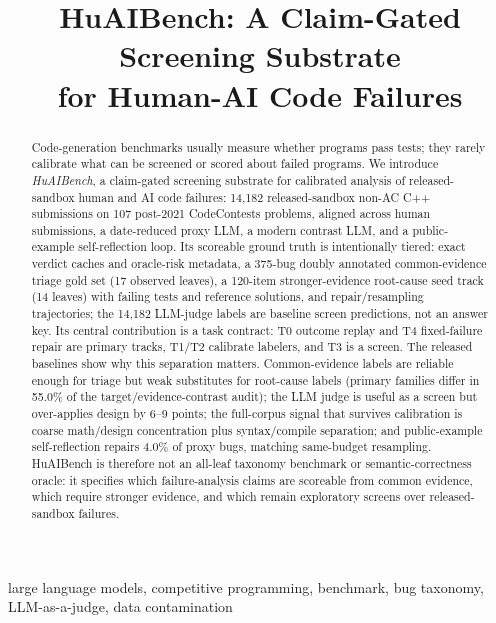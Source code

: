 \documentclass[conference]{IEEEtran}
\begin{document}
\title{HuAIBench: A Claim-Gated Screening Substrate\\
for Human-AI Code Failures}

\author{
}

\maketitle

\begin{abstract}
Code-generation benchmarks usually measure whether programs pass tests; they rarely
calibrate what can be screened or scored about failed programs. We introduce
\emph{HuAIBench}, a claim-gated screening substrate for calibrated analysis of
released-sandbox human and AI code failures:
14{,}182 released-sandbox non-AC C++ submissions on 107 post-2021 CodeContests
problems, aligned across human submissions, a date-reduced proxy LLM, a modern
contrast LLM, and a public-example self-reflection loop. Its scoreable ground truth
is intentionally tiered: exact verdict caches and oracle-risk metadata, a 375-bug
doubly annotated common-evidence triage gold set (17 observed leaves), a 120-item
stronger-evidence root-cause seed track (14 leaves) with failing tests and reference
solutions, and repair/resampling trajectories; the 14{,}182 LLM-judge labels are
baseline screen predictions, not an answer key. Its central contribution is a task
contract: T0 outcome replay and T4 fixed-failure repair are primary tracks, T1/T2
calibrate labelers, and T3 is a screen. The released baselines show why this
separation matters. Common-evidence labels are reliable enough for triage but weak
substitutes for root-cause labels (primary families differ in 55.0\% of the
target/evidence-contrast audit); the LLM judge is useful as a screen but over-applies design by 6--9 points;
the full-corpus signal that survives calibration is coarse math/design concentration
plus syntax/compile separation; and public-example self-reflection repairs 4.0\% of
proxy bugs, matching same-budget resampling. HuAIBench is therefore not an all-leaf
taxonomy benchmark or semantic-correctness oracle: it specifies which
failure-analysis claims are scoreable from common evidence, which require stronger
evidence, and which remain exploratory screens over released-sandbox failures.
\end{abstract}

\begin{IEEEkeywords}
large language models, competitive programming, benchmark, bug taxonomy,
LLM-as-a-judge, data contamination
\end{IEEEkeywords}
\end{document}
